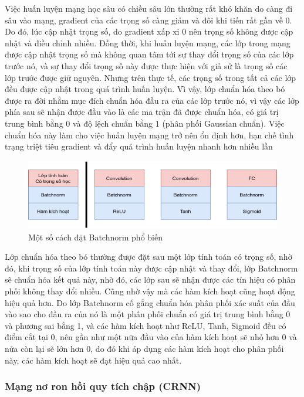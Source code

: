 Việc huấn luyện mạng học sâu có chiều sâu lớn thường rất khó khăn do càng đi sâu vào mạng, gradient của các trọng số càng giảm và đôi khi tiến rất gần về 0. Do đó, lúc cập nhật trọng số, do gradient xấp xỉ 0 nên trọng số không được cập nhật và điều chỉnh nhiều. Đồng thời, khi huấn luyện mạng, các lớp trong mạng được cập nhật trọng số mà không quan tâm tới sự thay đổi trọng số của các lớp trước nó, và sự thay đổi trọng số này được thực hiện với giả sử là trọng số các lớp trước được giữ nguyên. Nhưng trên thực tế, các trọng số trong tất cả các lớp đều được cập nhật trong quá trình huấn luyện. Vì vậy, lớp chuẩn hóa theo bó được ra đời nhằm mục đích chuẩn hóa đầu ra của các lớp trước nó, vì vậy các lớp phía sau sẽ nhận được đầu vào là các ma trận đã được chuẩn hóa, có giá trị trung bình bằng 0 và độ lệch chuẩn bằng 1 (phân phối Gaussian chuẩn). Việc chuẩn hóa này làm cho việc huấn luyện mạng trở nên ổn định hơn, hạn chế tình trạng triệt tiêu gradient và đẩy quá trình huấn luyện nhanh hơn nhiều lần

\begin{figure}[H]
    \centering
    \includegraphics[width=13cm]{./content/materials/batchnorm.png}
    \caption{Một số cách đặt Batchnorm phổ biến}
\end{figure}

Lớp chuẩn hóa theo bó thường được đặt sau một lớp tính toán có trọng số, nhờ đó, khi trọng số của lớp tính toán này được cập nhật và thay đổi, lớp Batchnorm sẽ chuẩn hóa kết quả này, nhờ đó, các lớp sau sẽ nhận được các tín hiệu có phân phối không thay đổi nhiều. Cũng nhờ vậy mà các hàm kích hoạt cũng hoạt động hiệu quả hơn. Do lớp Batchnorm cố gắng chuẩn hóa phân phối xác suất của đầu vào sao cho đầu ra của nó là một phân phối chuẩn có giá trị trung bình bằng 0 và phương sai bằng 1, và các hàm kích hoạt như ReLU, Tanh, Sigmoid đều có điểm cắt tại 0, nên gần như một nữa đầu vào của hàm kích hoạt sẽ nhỏ hơn 0 và nửa còn lại sẽ lớn hơn 0, do đó khi áp dụng các hàm kích hoạt cho phân phối này, các hàm kích hoạt sẽ đạt hiệu quả cao nhất.

\subsubsection{Mạng nơ ron hồi quy tích chập (CRNN)}

